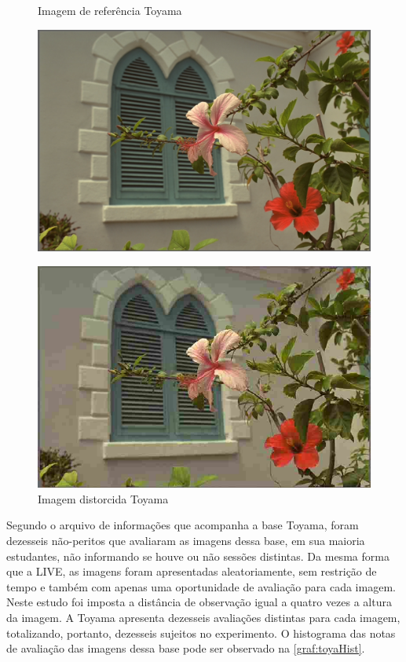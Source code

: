\begin{figure}[htb]
 \label{fig:toyaex}
 \centering
  \begin{minipage}{0.48\textwidth}
    \centering
    \caption{Imagem de referência Toyama} \label{fig:toyaref}
    \includegraphics[width=\textwidth]{../img/toyaref07.pdf}
  \end{minipage}
  \hfill
  \begin{minipage}{0.48\textwidth}
    \centering
    \caption{Imagem distorcida Toyama} \label{fig:toyadist}
    \includegraphics[width=\textwidth]{../img/toyadist07_79.pdf}
  \end{minipage}
\end{figure}

Segundo o arquivo de informações que acompanha a base Toyama, foram dezesseis não-peritos que avaliaram as imagens dessa base, em sua maioria estudantes, não informando se houve ou não sessões distintas. Da mesma forma que a LIVE, as imagens foram apresentadas aleatoriamente, sem restrição de tempo e também com apenas uma oportunidade de avaliação para cada imagem. Neste estudo foi imposta a distância de observação igual a quatro vezes a altura da imagem. A Toyama apresenta dezesseis avaliações distintas para cada imagem, totalizando, portanto, dezesseis sujeitos no experimento. O histograma das notas de avaliação das imagens dessa base pode ser observado na \autoref{graf:toyaHist}.
 

